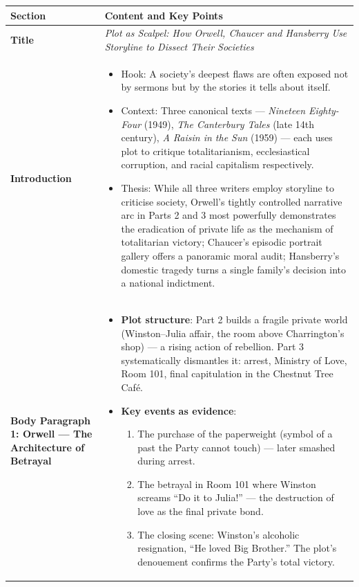\documentclass[11pt]{article}
\newcounter{popsec}
\newcounter{popsub}
\newcommand{\courssub}[1]{%
  \stepcounter{popsub}%
  \par\vspace{9pt}\noindent{\popxbold\fontsize{11.5}{13}\selectfont\color{popink}{\color{poporange}\thepopsec.\thepopsub}\hspace{6pt}#1}\par\nopagebreak\vspace{4pt}
}
\begin{document}
\courssub{Model Answer}
\begin{exemplebox}
\begin{center}
\begin{tabularx}{\linewidth}{|l|X|}
\hline
\rowcolor{popblueL}
\textbf{Section} & \textbf{Content and Key Points} \\
\hline
\textbf{Title} & \emph{Plot as Scalpel: How Orwell, Chaucer and Hansberry Use Storyline to Dissect Their Societies} \\
\hline
\textbf{Introduction} & 
\begin{itemize}
    \item Hook: A society's deepest flaws are often exposed not by sermons but by the stories it tells about itself.
    \item Context: Three canonical texts — \emph{Nineteen Eighty-Four} (1949), \emph{The Canterbury Tales} (late 14th century), \emph{A Raisin in the Sun} (1959) — each uses plot to critique totalitarianism, ecclesiastical corruption, and racial capitalism respectively.
    \item Thesis: While all three writers employ storyline to criticise society, Orwell's tightly controlled narrative arc in Parts 2 and 3 most powerfully demonstrates the eradication of private life as the mechanism of totalitarian victory; Chaucer's episodic portrait gallery offers a panoramic moral audit; Hansberry's domestic tragedy turns a single family's decision into a national indictment.
\end{itemize} \\
\hline
\textbf{Body Paragraph 1: Orwell — The Architecture of Betrayal} & 
\begin{itemize}
    \item \textbf{Plot structure}: Part 2 builds a fragile private world (Winston–Julia affair, the room above Charrington's shop) — a rising action of rebellion. Part 3 systematically dismantles it: arrest, Ministry of Love, Room 101, final capitulation in the Chestnut Tree Café.
    \item \textbf{Key events as evidence}: 
    \begin{enumerate}
        \item The purchase of the paperweight (symbol of a past the Party cannot touch) — later smashed during arrest.
        \item The betrayal in Room 101 where Winston screams ``Do it to Julia!'' — the destruction of love as the final private bond.
        \item The closing scene: Winston's alcoholic resignation, ``He loved Big Brother.'' The plot's denouement confirms the Party's total victory.

\end{enumerate}
\end{itemize}
\end{tabularx}
\end{center}
\end{exemplebox}
\end{document}
